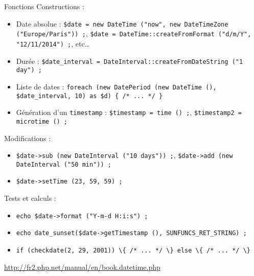 \begin{frame}{Fonctions}
	Constructions :
	\begin{itemize}
		\item Date absolue : \lstinline~$date = new DateTime ("now", new DateTimeZone ("Europe/Paris")) ;~, \lstinline~$date = DateTime::createFromFormat ("d/m/Y", "12/11/2014") ;~, etc\ldots
		\item Durée : \lstinline~$date_interval = DateInterval::createFromDateString ("1 day") ;~
		\item Liste de dates : \lstinline~foreach (new DatePeriod (new DateTime (), $date_interval, 10) as $d) { /* ... */ }~
		\item Génération d’un \texttt{timestamp} : \lstinline~$timestamp = time () ;~, \lstinline~$timestamp2 = microtime () ;~
	\end{itemize}
	Modifications :
	\begin{itemize}
		\item \lstinline~$date->sub (new DateInterval ("10 days")) ;~, \lstinline~$date->add (new DateInterval ("50 min")) ;~
		\item \lstinline~$date->setTime (23, 59, 59) ;~
	\end{itemize}
	Tests et calculs :
	\begin{itemize}
		\item \lstinline~echo $date->format ("Y-m-d H:i:s") ;~
		\item \lstinline~echo date_sunset($date->getTimestamp (), SUNFUNCS_RET_STRING) ;~
		\item \lstinline~if (checkdate(2, 29, 2001)) \{ /* ... */ \} else \{ /* ... */ \}~
	\end{itemize}
	\url{http://fr2.php.net/manual/en/book.datetime.php}
\end{frame}
